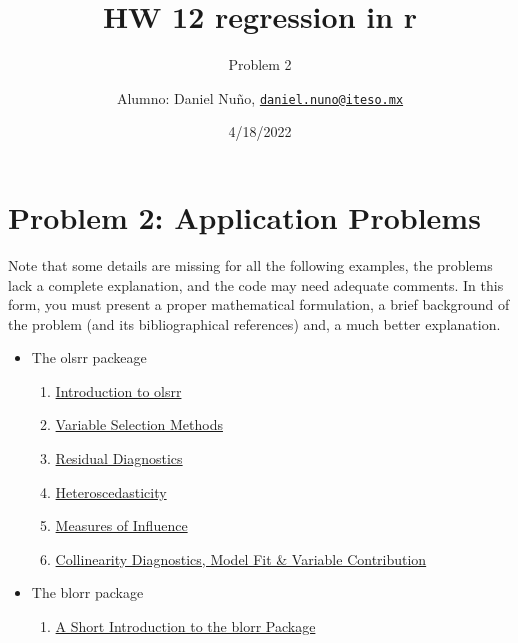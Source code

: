 \documentclass[
]{article}
\title{HW 12 regression in r}
\subtitle{Problem 2}
\author{Alumno: Daniel Nuño,
\href{mailto:daniel.nuno@iteso.mx}{\nolinkurl{daniel.nuno@iteso.mx}}}
\date{4/18/2022}
\providecommand{\tightlist}{%
  \setlength{\itemsep}{0pt}\setlength{\parskip}{0pt}}
\begin{document}
\maketitle

{
\setcounter{tocdepth}{2}
\tableofcontents
}
\hypertarget{problem-2-application-problems}{%
\section{Problem 2: Application
Problems}\label{problem-2-application-problems}}

Note that some details are missing for all the following examples, the
problems lack a complete explanation, and the code may need adequate
comments. In this form, you must present a proper mathematical
formulation, a brief background of the problem (and its bibliographical
references) and, a much better explanation.

\begin{itemize}
\tightlist
\item
  The olsrr packeage

  \begin{enumerate}
  \def\labelenumi{(\alph{enumi})}
  \tightlist
  \item
    \href{https://olsrr.rsquaredacademy.com/articles/intro.html}{Introduction
    to olsrr}
  \item
    \href{https://olsrr.rsquaredacademy.com/articles/variable_selection.html}{Variable
    Selection Methods}
  \item
    \href{https://olsrr.rsquaredacademy.com/articles/residual_diagnostics.html}{Residual
    Diagnostics}
  \item
    \href{https://olsrr.rsquaredacademy.com/articles/heteroskedasticity.html}{Heteroscedasticity}
  \item
    \href{https://olsrr.rsquaredacademy.com/articles/influence_measures.html}{Measures
    of Influence}
  \item
    \href{https://olsrr.rsquaredacademy.com/articles/regression_diagnostics.html}{Collinearity
    Diagnostics, Model Fit \& Variable Contribution}
  \end{enumerate}
\item
  The blorr package

  \begin{enumerate}
  \def\labelenumi{(\alph{enumi})}
  \tightlist
  \item
    \href{https://blorr.rsquaredacademy.com/articles/introduction.html}{A
    Short Introduction to the blorr Package}
  \end{enumerate}
\end{itemize}
\end{document}
